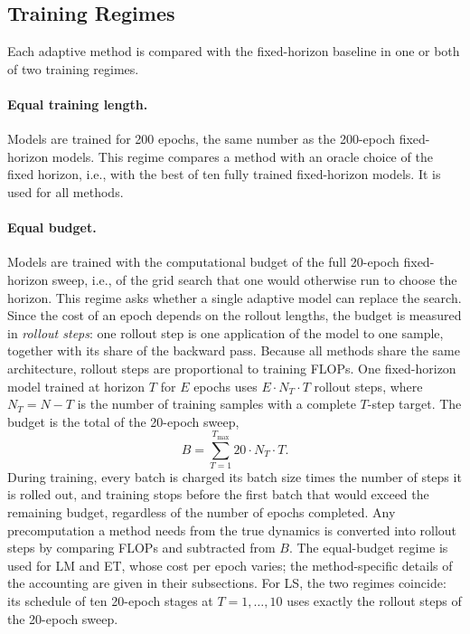 \documentclass{article}
\begin{document}
\subsection{Training Regimes}
\label{sec:regimes}

Each adaptive method is compared with the fixed-horizon baseline in one or both of two training regimes.

\paragraph{Equal training length.}
Models are trained for 200 epochs, the same number as the 200-epoch fixed-horizon models. This regime compares a method with an oracle choice of the fixed horizon, i.e., with the best of ten fully trained fixed-horizon models. It is used for all methods.

\paragraph{Equal budget.}
Models are trained with the computational budget of the full 20-epoch fixed-horizon sweep, i.e., of the grid search that one would otherwise run to choose the horizon. This regime asks whether a single adaptive model can replace the search. Since the cost of an epoch depends on the rollout lengths, the budget is measured in \emph{rollout steps}: one rollout step is one application of the model to one sample, together with its share of the backward pass. Because all methods share the same architecture, rollout steps are proportional to training FLOPs. One fixed-horizon model trained at horizon $T$ for $E$ epochs uses $E \cdot N_T \cdot T$ rollout steps, where $N_T = N - T$ is the number of training samples with a complete $T$-step target. The budget is the total of the 20-epoch sweep,
\[
B = \sum_{T=1}^{T_{\max}} 20 \cdot N_T \cdot T.
\]
During training, every batch is charged its batch size times the number of steps it is rolled out, and training stops before the first batch that would exceed the remaining budget, regardless of the number of epochs completed. Any precomputation a method needs from the true dynamics is converted into rollout steps by comparing FLOPs and subtracted from $B$. The equal-budget regime is used for LM and ET, whose cost per epoch varies; the method-specific details of the accounting are given in their subsections. For LS, the two regimes coincide: its schedule of ten 20-epoch stages at $T = 1, \dots, 10$ uses exactly the rollout steps of the 20-epoch sweep.
\end{document}
